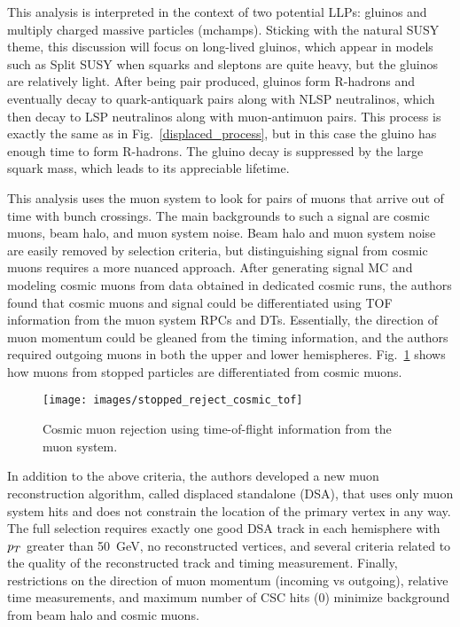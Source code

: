 \documentclass[12pt]{article}
\begin{document}
        This analysis is interpreted in the context of two potential LLPs: gluinos and multiply charged massive particles (mchamps). Sticking with the natural SUSY theme, this discussion will focus on long-lived gluinos, which appear in models such as Split SUSY when squarks and sleptons are quite heavy, but the gluinos are relatively light. After being pair produced, gluinos form R-hadrons and eventually decay to quark-antiquark pairs along with NLSP neutralinos, which then decay to LSP neutralinos along with muon-antimuon pairs. This process is exactly the same as in Fig.~\ref{displaced_process}, but in this case the gluino has enough time to form R-hadrons. The gluino decay is suppressed by the large squark mass, which leads to its appreciable lifetime.

        This analysis uses the muon system to look for pairs of muons that arrive out of time with bunch crossings. The main backgrounds to such a signal are cosmic muons, beam halo, and muon system noise. Beam halo and muon system noise are easily removed by selection criteria, but distinguishing signal from cosmic muons requires a more nuanced approach. After generating signal MC and modeling cosmic muons from data obtained in dedicated cosmic runs, the authors found that cosmic muons and signal could be differentiated using TOF information from the muon system RPCs and DTs. Essentially, the direction of muon momentum could be gleaned from the timing information, and the authors required outgoing muons in both the upper and lower hemispheres. Fig.~\ref{stopped_muon_differentiation} shows how muons from stopped particles are differentiated from cosmic muons.
        
        \noindent \begin{figure}[htbp] \begin{center}
        \texttt{[image: images/stopped\_reject\_cosmic\_tof]}
            \caption{Cosmic muon rejection using time-of-flight information from the muon system.~\cite{cms_stopped}}
        \label{stopped_muon_differentiation}
        \end{center} \end{figure}

        In addition to the above criteria, the authors developed a new muon reconstruction algorithm, called displaced standalone (DSA), that uses only muon system hits and does not constrain the location of the primary vertex in any way. The full selection requires exactly one good DSA track in each hemisphere with $p_T$ greater than \SI{50}{\giga\electronvolt}, no reconstructed vertices, and several criteria related to the quality of the reconstructed track and timing measurement. Finally, restrictions on the direction of muon momentum (incoming vs outgoing), relative time measurements, and maximum number of CSC hits (0) minimize background from beam halo and cosmic muons.
\end{document}
